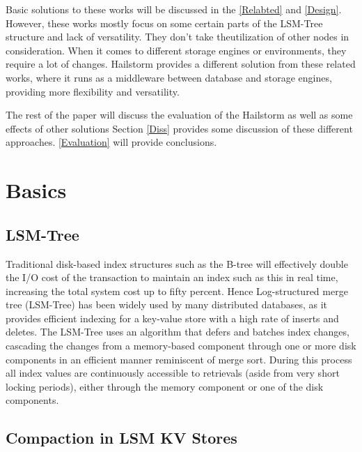 \documentclass[a4paper,10pt,twoside]{article}
\begin{document}
Basic solutions to these works will be discussed in the \ref{Relabted} and \ref{Design}.
However, these works mostly focus on some certain parts of the LSM-Tree structure and lack of versatility.
They don’t take theutilization of other nodes in consideration. 
When it comes to different storage engines or environments, they require a lot of changes.
Hailstorm provides a different solution from these related works, where it runs as a middleware between database and storage engines, providing more flexibility and versatility.
\par
The rest of the paper will discuss the evaluation of the Hailstorm as well as some effects of other solutions
Section \ref{Diss} provides some discussion of these different approaches.
\ref{Evaluation} will provide conclusions.

\section{Basics}
\label{Basics}

\subsection{LSM-Tree}
\label{Basic.LSM-tree}

Traditional disk-based index structures such as the B-tree will effectively double the I/O cost of the transaction to maintain an index such as this in real time, increasing the total system cost up to fifty percent. 
Hence Log-structured merge tree (LSM-Tree) \cite{LSM-Tree} has been widely used by many distributed databases, as it provides efficient indexing for a key-value store with a high rate of inserts and deletes.
The LSM-Tree uses an algorithm that defers and batches index changes, cascading the changes from a memory-based component through one or more disk components in an efficient manner reminiscent of merge sort. 
During this process all index values are continuously accessible to retrievals (aside from very short locking periods), either through the memory component or one of the disk components.

\subsection{Compaction in LSM KV Stores}
\label{Basic.Compaction}
\end{document}
